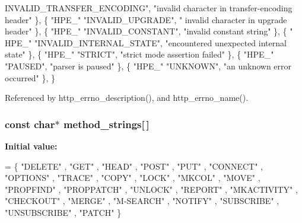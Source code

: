 \begin{DoxyCode}
{      INVALID\_TRANSFER\_ENCODING"},  \textcolor{stringliteral}{"invalid character in transfer-encoding header"}  \},    \{ \textcolor{stringliteral}{"HPE\_"} \textcolor{stringliteral}{"INVALID\_UPGRADE"},  \textcolor{stringliteral}{"
      invalid character in upgrade header"}  \},    \{ \textcolor{stringliteral}{"HPE\_"} \textcolor{stringliteral}{"INVALID\_CONSTANT"},  \textcolor{stringliteral}{"invalid constant string"}  \},    \{ \textcolor{stringliteral}{"
      HPE\_"} \textcolor{stringliteral}{"INVALID\_INTERNAL\_STATE"},  \textcolor{stringliteral}{"encountered unexpected internal state"}  \},   \{ \textcolor{stringliteral}{"HPE\_"} \textcolor{stringliteral}{"STRICT"},  \textcolor{stringliteral}{"strict
       mode assertion failed"}  \},    \{ \textcolor{stringliteral}{"HPE\_"} \textcolor{stringliteral}{"PAUSED"},  \textcolor{stringliteral}{"parser is paused"}  \},    \{ \textcolor{stringliteral}{"HPE\_"} \textcolor{stringliteral}{"UNKNOWN"},  \textcolor{stringliteral}{"an unknown
       error occurred"}  \}, \}
\end{DoxyCode}


Referenced by http\+\_\+errno\+\_\+description(), and http\+\_\+errno\+\_\+name().

\subsubsection[{method\+\_\+strings}]{\setlength{\rightskip}{0pt plus 5cm}const char$\ast$ method\+\_\+strings[$\,$]\hspace{0.3cm}{\ttfamily [static]}}\label{http__parser_8c_a5aeac132f8919dfe8217cdcdc0e8388f}
{\bfseries Initial value\+:}
\begin{DoxyCode}
=
  \{ \textcolor{stringliteral}{"DELETE"}
  , \textcolor{stringliteral}{"GET"}
  , \textcolor{stringliteral}{"HEAD"}
  , \textcolor{stringliteral}{"POST"}
  , \textcolor{stringliteral}{"PUT"}
  , \textcolor{stringliteral}{"CONNECT"}
  , \textcolor{stringliteral}{"OPTIONS"}
  , \textcolor{stringliteral}{"TRACE"}
  , \textcolor{stringliteral}{"COPY"}
  , \textcolor{stringliteral}{"LOCK"}
  , \textcolor{stringliteral}{"MKCOL"}
  , \textcolor{stringliteral}{"MOVE"}
  , \textcolor{stringliteral}{"PROPFIND"}
  , \textcolor{stringliteral}{"PROPPATCH"}
  , \textcolor{stringliteral}{"UNLOCK"}
  , \textcolor{stringliteral}{"REPORT"}
  , \textcolor{stringliteral}{"MKACTIVITY"}
  , \textcolor{stringliteral}{"CHECKOUT"}
  , \textcolor{stringliteral}{"MERGE"}
  , \textcolor{stringliteral}{"M-SEARCH"}
  , \textcolor{stringliteral}{"NOTIFY"}
  , \textcolor{stringliteral}{"SUBSCRIBE"}
  , \textcolor{stringliteral}{"UNSUBSCRIBE"}
  , \textcolor{stringliteral}{"PATCH"}
  \}
\end{DoxyCode}


